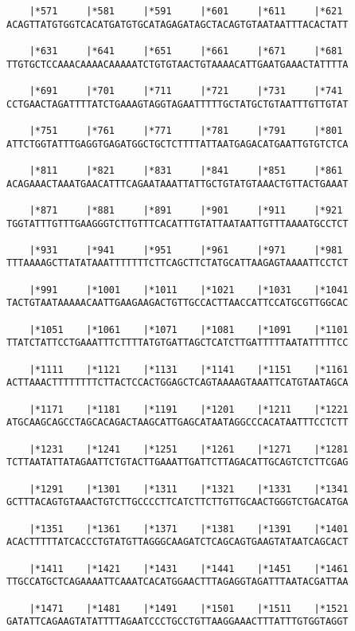 \documentclass{article}
\begin{document}
\begin{Verbatim}
    |*571     |*581     |*591     |*601     |*611     |*621 
ACAGTTATGTGGTCACATGATGTGCATAGAGATAGCTACAGTGTAATAATTTACACTATT
  
    |*631     |*641     |*651     |*661     |*671     |*681 
TTGTGCTCCAAACAAAACAAAAATCTGTGTAACTGTAAAACATTGAATGAAACTATTTTA
  
    |*691     |*701     |*711     |*721     |*731     |*741 
CCTGAACTAGATTTTATCTGAAAGTAGGTAGAATTTTTGCTATGCTGTAATTTGTTGTAT
  
    |*751     |*761     |*771     |*781     |*791     |*801 
ATTCTGGTATTTGAGGTGAGATGGCTGCTCTTTTATTAATGAGACATGAATTGTGTCTCA
  
    |*811     |*821     |*831     |*841     |*851     |*861 
ACAGAAACTAAATGAACATTTCAGAATAAATTATTGCTGTATGTAAACTGTTACTGAAAT
  
    |*871     |*881     |*891     |*901     |*911     |*921 
TGGTATTTGTTTGAAGGGTCTTGTTTCACATTTGTATTAATAATTGTTTAAAATGCCTCT
  
    |*931     |*941     |*951     |*961     |*971     |*981 
TTTAAAAGCTTATATAAATTTTTTTCTTCAGCTTCTATGCATTAAGAGTAAAATTCCTCT
  
    |*991     |*1001    |*1011    |*1021    |*1031    |*1041
TACTGTAATAAAAACAATTGAAGAAGACTGTTGCCACTTAACCATTCCATGCGTTGGCAC
  
    |*1051    |*1061    |*1071    |*1081    |*1091    |*1101
TTATCTATTCCTGAAATTTCTTTTATGTGATTAGCTCATCTTGATTTTTAATATTTTTCC
  
    |*1111    |*1121    |*1131    |*1141    |*1151    |*1161
ACTTAAACTTTTTTTTCTTACTCCACTGGAGCTCAGTAAAAGTAAATTCATGTAATAGCA
  
    |*1171    |*1181    |*1191    |*1201    |*1211    |*1221
ATGCAAGCAGCCTAGCACAGACTAAGCATTGAGCATAATAGGCCCACATAATTTCCTCTT
  
    |*1231    |*1241    |*1251    |*1261    |*1271    |*1281
TCTTAATATTATAGAATTCTGTACTTGAAATTGATTCTTAGACATTGCAGTCTCTTCGAG
  
    |*1291    |*1301    |*1311    |*1321    |*1331    |*1341
GCTTTACAGTGTAAACTGTCTTGCCCCTTCATCTTCTTGTTGCAACTGGGTCTGACATGA
  
    |*1351    |*1361    |*1371    |*1381    |*1391    |*1401
ACACTTTTTATCACCCTGTATGTTAGGGCAAGATCTCAGCAGTGAAGTATAATCAGCACT
  
    |*1411    |*1421    |*1431    |*1441    |*1451    |*1461
TTGCCATGCTCAGAAAATTCAAATCACATGGAACTTTAGAGGTAGATTTAATACGATTAA
  
    |*1471    |*1481    |*1491    |*1501    |*1511    |*1521
GATATTCAGAAGTATATTTTAGAATCCCTGCCTGTTAAGGAAACTTTATTTGTGGTAGGT
  

\end{Verbatim}
\end{document}
